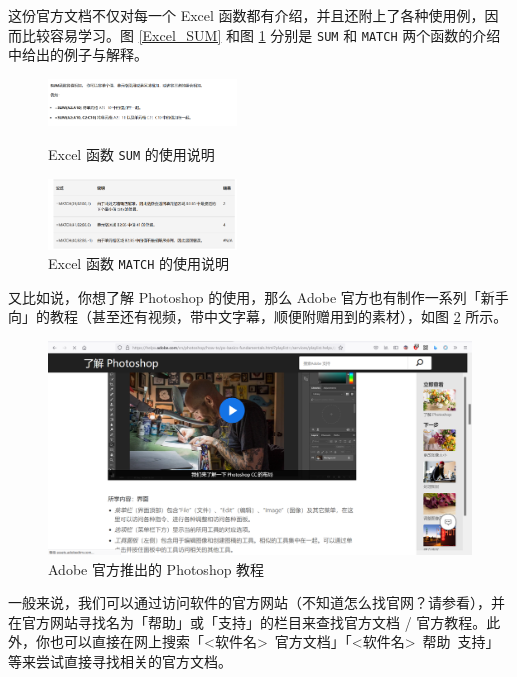 这份官方文档不仅对每一个 Excel 函数都有介绍，并且还附上了各种使用例，因而比较容易学习。图 \ref{Excel_SUM} 和图 \ref{Excel_MATCH} 分别是 \verb|SUM| 和 \verb|MATCH| 两个函数的介绍中给出的例子与解释。

\begin{figure}[htbp]
  \centering
  \begin{minipage}{6cm}
    \centering
    \includegraphics[width=5cm]{assets/Excel_SUM.png}
    \caption{Excel 函数 \texttt{SUM} 的使用说明}
    \label{Excel_SUM}
  \end{minipage}
  \qquad
  \begin{minipage}{6cm}
    \centering
    \includegraphics[width=5cm]{assets/Excel_MATCH.png}
    \caption{Excel 函数 \texttt{MATCH} 的使用说明}
    \label{Excel_MATCH}
  \end{minipage}
\end{figure}

又比如说，你想了解 Photoshop 的使用，那么 Adobe 官方也有制作一系列「新手向」的教程（甚至还有视频，带中文字幕，顺便附赠用到的素材），如图 \ref{PS_official_tutorial} 所示。

\begin{figure}[htb!]
  \centering
  \includegraphics[width=12cm]{assets/PS_official_tutorial.png}
  \caption{Adobe 官方推出的 Photoshop 教程}
  \label{PS_official_tutorial}
\end{figure}

一般来说，我们可以通过访问软件的官方网站（不知道怎么找官网？请参看），并在官方网站寻找名为「帮助」或「支持」的栏目来查找官方文档 / 官方教程。此外，你也可以直接在网上搜索「<软件名>\ 官方文档」「<软件名>\ 帮助\ 支持」等来尝试直接寻找相关的官方文档。

